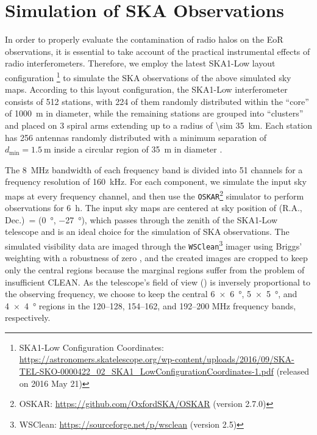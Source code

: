 \documentclass[twocolumn]{aastex62}
\newcommand{\R}[1]{\mathrm{#1}}
\newcommand{\fov}{\text{Fo\!V}}
\begin{document}
\section{Simulation of SKA Observations}
\label{sec:obs-simu}

In order to properly evaluate the contamination of radio halos
on the EoR observations, it is essential to take account of the
practical instrumental effects of radio interferometers.
Therefore, we employ the latest SKA1-Low layout configuration%
\footnote{\raggedright%
  SKA1-Low Configuration Coordinates:
  \url{https://astronomers.skatelescope.org/wp-content/uploads/2016/09/SKA-TEL-SKO-0000422_02_SKA1_LowConfigurationCoordinates-1.pdf}
  (released on 2016 May 21)
}
to simulate the SKA observations of the above simulated sky maps.
According to this layout configuration,
the SKA1-Low interferometer consists of 512 stations, with 224 of them
randomly distributed within the \enquote{core} of \SI{1000}{\meter} in
diameter, while the remaining stations are grouped into \enquote{clusters}
and placed on 3 spiral arms extending up to a radius of
\SI{\sim 35}{\kilo\meter}.
Each station has 256 antennas randomly distributed with a minimum separation
of $d_{\R{min}} = \SI{1.5}{\meter}$ inside a circular region of
\SI{35}{\meter} in diameter \citep[e.g.,][]{mort2017}.

The \SI{8}{\MHz} bandwidth of each frequency band is divided into 51
channels for a frequency resolution of \SI{160}{\kilo\hertz}.
For each component, we simulate the input sky maps at every frequency
channel, and then use the \texttt{OSKAR}\footnote{%
  OSKAR: \url{https://github.com/OxfordSKA/OSKAR} (version 2.7.0)}
simulator \citep{mort2010} to perform observations for \SI{6}{\hour}.
The input sky maps are centered at sky position of
(R.A., Dec.)\ = (\SI{0}{\degree}, \SI{-27}{\degree}),
which passes through the zenith of the SKA1-Low telescope and
is an ideal choice for the simulation of SKA observations.
The simulated visibility data are imaged through the
\texttt{WSClean}\footnote{%
  WSClean: \url{https://sourceforge.net/p/wsclean} (version 2.5)}
imager \citep{offringa2014} using Briggs' weighting with a
robustness of zero \citep{briggs1995},
and the created images are cropped to keep only the central regions
because the marginal regions suffer from the problem of insufficient
CLEAN.
As the telescope's field of view (\fov) is inversely proportional to
the observing frequency, we choose to keep the central
\SI[product-units=repeat]{6 x 6}{\degree},
\SI[product-units=repeat]{5 x 5}{\degree}, and
\SI[product-units=repeat]{4 x 4}{\degree}
regions in the \numrange{120}{128}, \numrange{154}{162}, and
\numrange{192}{200} \si{\MHz} frequency bands, respectively.
\end{document}
